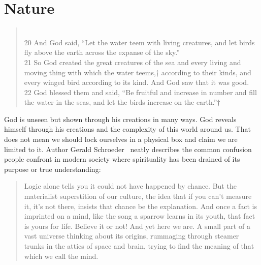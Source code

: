\documentclass[11pt,a4paper]{scrartcl} %
\begin{document}
\section{Nature}
\begin{verse}
\textcolor{Maroon}{}\\
20 And God said, “Let the water teem with living creatures, and let birds fly above the earth across the expanse of the sky.” \\
21 So God created the great creatures of the sea and every living and moving thing with which the water teems,† according to their kinds, and every winged bird according to its kind. And God saw that it was good. \\
22 God blessed them and said, “Be fruitful and increase in number and fill the water in the seas, and let the birds increase on the earth.”† 
\end{verse}
\begin{doublespace}
God is unseen but shown through his creations in many ways. God reveals himself through his creations and the complexity of this world around us. That does not mean we should lock ourselves in a physical box and claim we are limited to it. Author Gerald Schroeder~\cite{GLSchroeder-2001} neatly describes the common confusion people confront in modern society where spirituality has been drained of its purpose or true understanding:
\end{doublespace}
\begin{quote}
Logic alone tells you it could not have happened by chance. But the materialist superstition of our culture, the idea that if you can’t measure it, it’s not there, insists that chance be the explanation. And once a fact is imprinted on a mind, like the song a sparrow learns in its youth, that fact is yours for life. Believe it or not! And yet here we are. A small part of a vast universe thinking about its origins, rummaging through steamer trunks in the attics of space and brain, trying to find the meaning of that which we call the mind. 
\end{quote}
\end{document}
